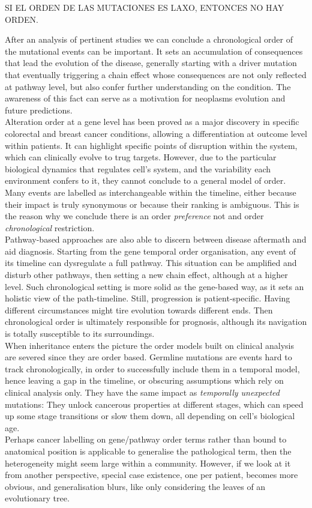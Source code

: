 SI EL ORDEN DE LAS MUTACIONES ES LAXO, ENTONCES NO HAY ORDEN.

After an analysis of pertinent studies we can conclude a chronological order of the mutational events can be important. It sets an accumulation of consequences that lead the evolution of the disease, generally starting with a driver mutation that eventually triggering a chain effect whose consequences are not only reflected at pathway level, but also confer further understanding on the condition. The awareness of this fact can serve as a motivation for neoplasms evolution and future predictions.
\\

Alteration order at a gene level has been proved as a major discovery in specific colorectal and breast cancer conditions, allowing a differentiation at outcome level within patients. It can highlight specific points of disruption within the system, which can clinically evolve to trug targets. However, due to the particular biological dynamics that regulates cell's system, and the variability each environment confers to it, they cannot conclude to a general model of order. Many events are labelled as interchangeable within the timeline, either because their impact is truly synonymous or because their ranking is ambiguous. This is the reason why we conclude there is an order \emph{preference} not and order \emph{chronological} restriction.
\\

Pathway-based approaches are also able to discern between disease aftermath and aid diagnosis. Starting from the gene temporal order organisation, any event of its timeline can dysregulate a full pathway. This situation can be amplified and disturb other pathways, then setting a new chain effect, although at a higher level. Such chronological setting is more solid as the gene-based way, as it sets an holistic view of the path-timeline. Still, progression is patient-specific. Having different circumstances might tire evolution towards different ends. Then chronological order is ultimately responsible for prognosis, although its navigation is totally susceptible to its surroundings.
\\

When inheritance enters the picture the order models built on clinical analysis are severed since they are order based. Germline mutations are events hard to track chronologically, in order to successfully include them in a temporal model, hence leaving a gap in the timeline, or obscuring assumptions which rely on clinical analysis only. They have the same impact as \emph{temporally unexpected} mutations: They unlock cancerous properties at different stages, which can speed up some stage transitions or slow them down, all depending on cell’s biological age.
\\

Perhaps cancer labelling on gene/pathway order terms rather than bound to anatomical position is applicable to generalise the pathological term, then the heterogeneity might seem large within a community. However, if we look at it from another perspective, special case existence, one per patient, becomes more obvious, and generalisation blurs, like only considering the leaves of an evolutionary tree.